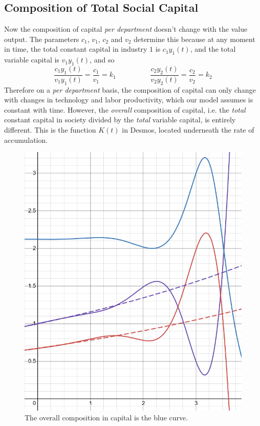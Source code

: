 \documentclass{article}
\theoremstyle{theorem}
\begin{document}
\subsection{Composition of Total Social Capital}
 Now the composition of capital \emph{per department} doesn't change with the value output. The parameters $c_1$, $v_1$, $c_2$ and $v_2$ determine this because at any moment in time, the total constant capital in industry $1$ is $c_1y_1(t)$, and the total variable capital is $v_1y_1(t)$, and so
\[ \frac{c_1y_1(t)}{v_1y_1(t)} = \frac{c_1}{v_1} = k_1 \hspace{2cm} \frac{c_2y_2(t)}{v_2y_2(t)} = \frac{c_2}{v_2} = k_2 \]
Therefore on a \emph{per department} basis, the composition of capital can only change with changes in technology and labor productivity, which our model assumes is constant with time. However, the \emph{overall} composition of capital, i.e. the \emph{total} constant capital in society divided by the \emph{total} variable capital, is entirely different. This is the function $K(t)$ in Desmos, located underneath the rate of accumulation. 
\begin{figure}[H]
\centering
\includegraphics[scale=.7]{Images/composition}
\caption{The overall composition in capital is the blue curve.}
\end{figure}
\end{document}
